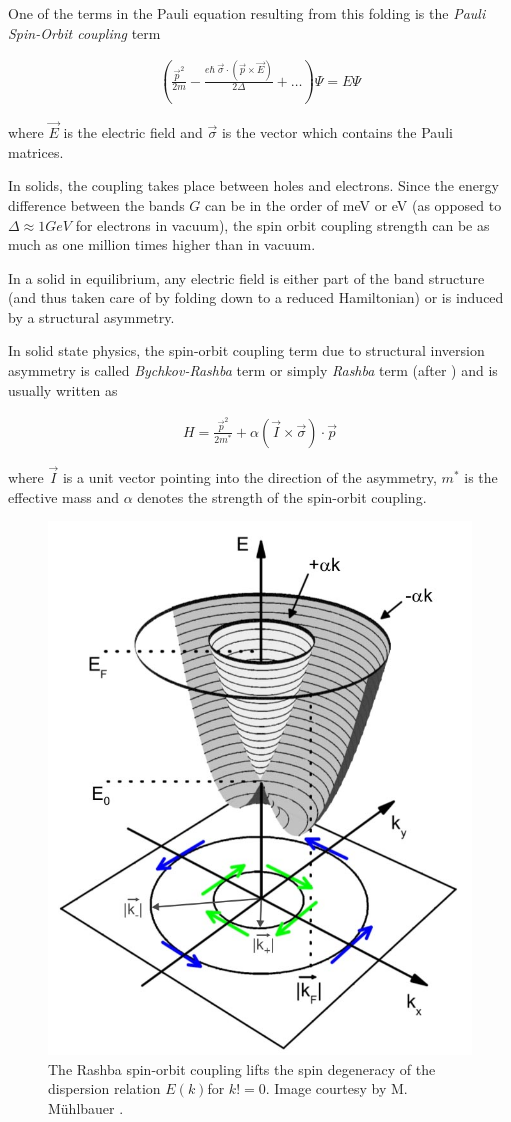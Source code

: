 \documentclass[11pt,twoside]{book}
\newcommand{\inp}[1]{\ensuremath{\left(#1\right)}}
\begin{document}
One of the terms in the Pauli equation resulting from this folding is the
\emph{Pauli Spin-Orbit coupling} term \cite{winkler2003}

\begin{align}
    \left( \frac{\vec p^2}{2m}- \frac{e\hbar \ \vec\sigma \cdot (\vec p \times \vec E)}
                    {2\Delta} +\ldots\right)\Psi = E \Psi
\end{align}

where $\vec E$ is the electric field and $\vec \sigma$ is the vector
which contains the Pauli matrices.

In solids, the coupling takes place between holes and electrons. Since the
energy difference between the bands $G$ can be in the order of meV or eV
(as opposed to $\Delta \approx 1GeV$ for electrons in vacuum), the spin orbit
coupling strength can be as much as one million times higher
than in vacuum.

In a solid in equilibrium, any electric field is either part of the band
structure (and thus taken care of by folding down to a reduced Hamiltonian)
or is induced by a structural asymmetry.

In solid state physics, the spin-orbit coupling term due to structural
inversion asymmetry is called \emph{Bychkov-Rashba} term or simply
\emph{Rashba} term (after \cite{rashba}) and is usually written as

\begin{align}
    H = \frac{\vec p ^2}{2m^*} + \alpha \inp{\vec I \times  \vec \sigma} \cdot \vec p
\end{align}

where $\vec I$ is a unit vector pointing into the direction of the asymmetry,
$m^*$ is the effective mass
and $\alpha$ denotes the strength of the spin-orbit coupling.

\begin{figure}[tb]
    \begin{center}
        \includegraphics[height=0.5\textwidth]{rashba-dispersion.jpg}
    \end{center}
    \caption{The Rashba spin-orbit coupling lifts the spin degeneracy of the
        dispersion relation $E(k)$for $k != 0$. 
        Image courtesy by M. Mühlbauer \cite{mathias}.
    }
    \label{fig:rashba-dispersion}
\end{figure}
\end{document}
